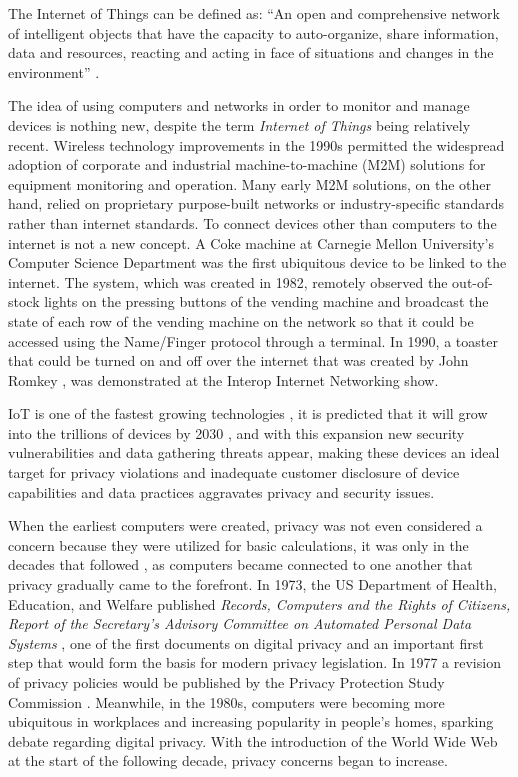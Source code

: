 The Internet of Things can be defined as: ``An open and comprehensive network
of intelligent objects that have the capacity to auto-organize, share information,
data and resources, reacting and acting in face of situations and changes
in the environment'' \cite{madakam2015internet}.

The idea of using computers and networks in order to monitor and manage
devices is nothing new, despite the term \textit{Internet of Things} being
relatively recent.
Wireless technology improvements in the 1990s permitted the widespread
adoption of corporate and industrial machine-to-machine (M2M) solutions
for equipment monitoring and operation. Many early M2M solutions, on the
other hand, relied on proprietary purpose-built networks or industry-specific
standards rather than internet standards. To connect devices other than
computers to the internet is not a new concept. A Coke machine at Carnegie
Mellon University's Computer Science Department \cite{EverhartInteresting}
was the first ubiquitous device to be linked to the internet. The system,
which was created in 1982, remotely observed the out-of-stock lights on
the pressing buttons of the vending machine and broadcast the state of each
row of the vending machine on the network so that it could be accessed using
the Name/Finger protocol through a terminal. In 1990, a toaster that could
be turned on and off over the internet that was created by John Romkey \cite{RomkeyToast},
was demonstrated at the Interop Internet Networking show.

IoT is one of the fastest growing technologies \cite{MohammadState}, it
is predicted that it will grow into the trillions of devices by 2030 \cite{SarawiInternet},
and with this expansion new security vulnerabilities and data gathering
threats appear, making these devices an ideal target for
privacy violations and inadequate customer disclosure of device capabilities
and data practices aggravates privacy and security issues.

When the earliest computers were created, privacy was not even considered
a concern because they were utilized for basic calculations, it was only in
the decades that followed \cite{hoffman1969computers}, as computers became connected to one another that privacy gradually came to
the forefront. In 1973, the US Department of Health, Education, and Welfare
published \textit{Records, Computers and the Rights of Citizens, Report of the
Secretary's Advisory Committee on Automated Personal Data Systems} \cite{hew1973records},
one of the first documents on digital privacy and an important first step that would
form the basis for modern privacy legislation. In 1977 a revision of privacy
policies would be published by the Privacy Protection Study Commission \cite{united1977personal}.
Meanwhile, in the 1980s, computers were becoming more ubiquitous in workplaces
and increasing popularity in people's homes, sparking debate regarding digital
privacy. With the introduction of the World Wide Web at the start of the following
decade, privacy concerns began to increase.


